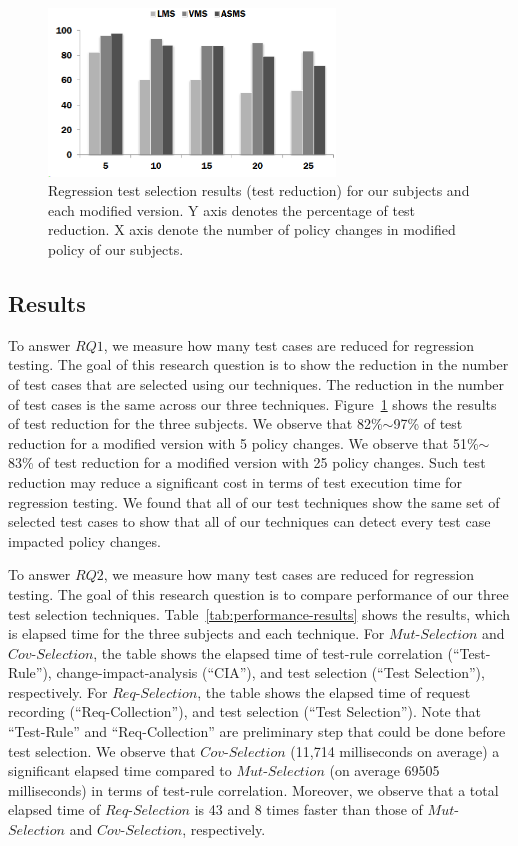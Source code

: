 \begin{figure}[htbp]
    \centering
        \includegraphics[width=3.0in]{reduction.eps}
        \vspace{-5pt}
    \caption{\label{fig:reduction} Regression test selection results (test reduction) for our subjects and each modified version. Y axis
    denotes the percentage of test reduction. X axis denote the number of policy changes in modified policy of our subjects.}
    \vspace{-10pt}
\end{figure}



\subsection{Results}
To answer $RQ1$, 
we measure how many test cases are reduced for regression testing.
The goal of this research question is to show the reduction in the number of test cases that
are selected using our techniques. The reduction in the number
of test cases is the same across our three techniques.
Figure~\ref{fig:reduction} shows the results of test reduction for the three subjects.
We observe that 82\%$\sim$97\% of test reduction for a modified version with 5 policy changes.
We observe that 51\%$\sim$83\% of test reduction for a modified version with 25 policy changes.
Such test reduction may reduce a significant cost in terms of test execution time
for regression testing. We found that all of our test techniques show the same
set of selected test cases to show that all of our techniques can detect every
test case impacted policy changes.

To answer $RQ2$, we measure how many test cases are reduced for regression testing.
The goal of this research question is to compare performance of our three
test selection techniques.
Table~\ref{tab:performance-results} shows the results, which is elapsed time for the three subjects and
each technique.
For $Mut$-$Selection$ and $Cov$-$Selection$, the table shows the elapsed time of
test-rule correlation (``Test-Rule''), change-impact-analysis (``CIA''), and test
selection (``Test Selection''), respectively.
For $Req$-$Selection$, the table shows the elapsed time of
request recording (``Req-Collection''), and test
selection (``Test Selection'').
Note that ``Test-Rule'' and ``Req-Collection'' are preliminary step that could
be done before test selection. 
We observe that $Cov$-$Selection$ (11,714 milliseconds on average) a significant
elapsed time compared to $Mut$-$Selection$ (on average 69505 milliseconds) in terms of test-rule correlation.
Moreover, we observe that a total elapsed time of $Req$-$Selection$ is 43 and 8 times
faster than those of $Mut$-$Selection$  and $Cov$-$Selection$, respectively.


